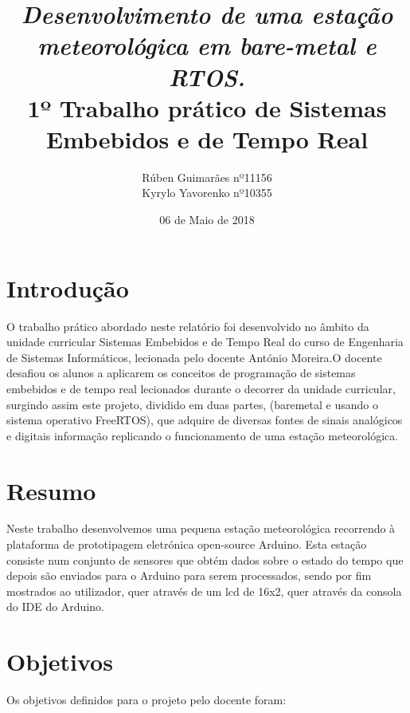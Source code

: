 \documentclass[11pt]{report}
\title{\textbf{\textit{Desenvolvimento de uma estação meteorológica em bare-metal e RTOS. }\\
		\large1º Trabalho prático de
		Sistemas Embebidos e de Tempo Real }}
\author{Rúben Guimarães nº11156\\ Kyrylo Yavorenko nº10355 }
\affil{Escola Superior de Tecnologia, IPCA \\
	Barcelos}
\date{06 de Maio de 2018}
\begin{document}
\maketitle




\tableofcontents


\chapter*{Introdução}


O trabalho prático abordado neste relatório foi desenvolvido no âmbito da unidade curricular Sistemas Embebidos e de Tempo Real do curso de Engenharia de Sistemas Informáticos, lecionada pelo docente António Moreira.\newline O docente desafiou os alunos a aplicarem os conceitos de programação de sistemas embebidos e de tempo real lecionados durante o decorrer da unidade curricular, surgindo assim este projeto, dividido em duas partes, (baremetal e usando o sistema operativo FreeRTOS), que adquire de diversas fontes de sinais analógicos e digitais informação replicando o funcionamento de uma estação meteorológica.


\clearpage



\chapter*{Resumo}

Neste trabalho desenvolvemos uma pequena estação meteorológica recorrendo à plataforma de prototipagem eletrónica open-source Arduino. Esta estação consiste num conjunto de sensores que obtém dados sobre o estado do tempo que depois são enviados para o Arduino para serem processados, sendo por fim mostrados ao utilizador, quer através de um lcd de 16x2, quer através da consola do IDE do Arduino.


\clearpage


\chapter*{Objetivos}

Os objetivos definidos para o projeto pelo docente foram:
\end{document}
